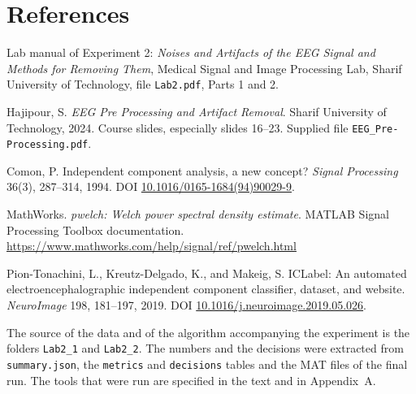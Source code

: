 \clearpage
\section*{References}

\begin{enumerate}[label={[\arabic*]},leftmargin=2.4em,itemsep=0.5em]
\item Lab manual of Experiment 2: \emph{Noises and Artifacts of the EEG Signal and Methods for Removing Them}, Medical Signal and Image Processing Lab, Sharif University of Technology, file \texttt{Lab2.pdf}, Parts 1 and 2.
\item Hajipour, S. \emph{EEG Pre Processing and Artifact Removal}. Sharif University of Technology, 2024. Course slides, especially slides 16--23. Supplied file \texttt{EEG\_Pre-Processing.pdf}.
\item Comon, P. Independent component analysis, a new concept? \emph{Signal Processing} 36(3), 287--314, 1994. DOI \href{https://doi.org/10.1016/0165-1684(94)90029-9}{10.1016/0165-1684(94)90029-9}.
\item MathWorks. \emph{pwelch: Welch power spectral density estimate}. MATLAB Signal Processing Toolbox documentation. \url{https://www.mathworks.com/help/signal/ref/pwelch.html}
\item Pion-Tonachini, L., Kreutz-Delgado, K., and Makeig, S. ICLabel: An automated electroencephalographic independent component classifier, dataset, and website. \emph{NeuroImage} 198, 181--197, 2019. DOI \href{https://doi.org/10.1016/j.neuroimage.2019.05.026}{10.1016/j.neuroimage.2019.05.026}.
\end{enumerate}

The source of the data and of the algorithm accompanying the experiment is the folders \texttt{Lab2\_1} and \texttt{Lab2\_2}. The numbers and the decisions were extracted from \texttt{summary.json}, the \texttt{metrics} and \texttt{decisions} tables and the MAT files of the final run. The tools that were run are specified in the text and in Appendix~A.

